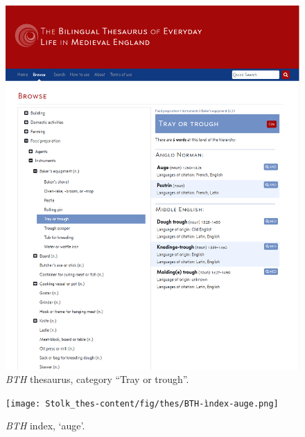 \begin{figure}[htbp]
  \centering
    \includegraphics[width=\linewidth]{Stolk_thes-content/fig/thes/BTH-thesaurus-traytrough.png}
  \caption{\textit{BTH} thesaurus, category ``Tray or trough''.}
  \label{fig:1.A:BTH:thesaurus}
\end{figure}

\begin{figure}[htbp]
  \centering
    \texttt{[image: Stolk\_thes-content/fig/thes/BTH-ìndex-auge.png]}
  \caption{\textit{BTH} index, `auge'.}
  \label{fig:1.A:BTH:index}
\end{figure}






